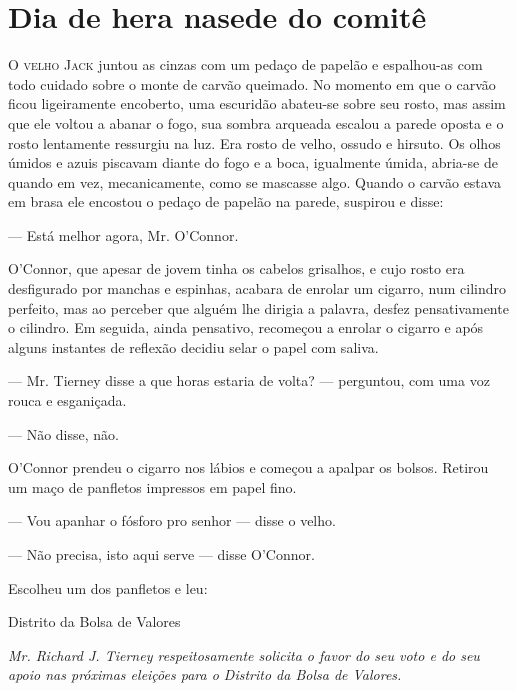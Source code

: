 \chapter[Dia de hera na sede do comitê]{Dia de hera na\break sede do comitê}

\textsc{O velho Jack} juntou as cinzas com um pedaço de papelão e espalhou-as com
todo cuidado sobre o monte de carvão queimado. No momento em que o
carvão ficou ligeiramente encoberto, uma escuridão abateu-se sobre seu
rosto, mas assim que ele voltou a abanar o fogo, sua sombra arqueada
escalou a parede oposta e o rosto lentamente ressurgiu na luz. Era
rosto de velho, ossudo e hirsuto. Os olhos úmidos e azuis piscavam
diante do fogo e a boca, igualmente úmida, abria-se de quando em vez,
mecanicamente, como se mascasse algo. Quando o carvão estava em brasa
ele encostou o pedaço de papelão na parede, suspirou e disse:

--- Está melhor agora, Mr. O'Connor.

O'Connor, que apesar de jovem tinha os cabelos grisalhos, e cujo rosto
era desfigurado por manchas e espinhas, acabara de enrolar um cigarro,
num cilindro perfeito, mas ao perceber que alguém lhe dirigia a
palavra, desfez pensativamente o cilindro. Em seguida, ainda
pensativo, recomeçou a enrolar o cigarro e após alguns instantes de
reflexão decidiu selar o papel com saliva.

--- Mr. Tierney disse a que horas estaria de volta? --- perguntou, com
uma voz rouca e esganiçada.

--- Não disse, não.

O'Connor prendeu o cigarro nos lábios e começou a apalpar os bolsos.
Retirou um maço de panfletos impressos em papel fino.

--- Vou apanhar o fósforo pro senhor --- disse o velho.

--- Não precisa, isto aqui serve --- disse O'Connor.

Escolheu um dos panfletos e leu:
\ \\

\begin{center}

Distrito da Bolsa de Valores
\end{center}

\textit{Mr. Richard J. Tierney respeitosamente solicita o favor do seu voto e
do seu apoio nas próximas eleições para o Distrito da Bolsa de
Valores.}
\ \\

